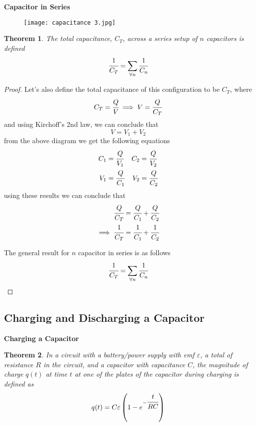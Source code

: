 \documentclass{article}
\newtheorem{theorem}{Theorem}[subsection]
\begin{document}
\textbf{Capacitor in Series}
\begin{figure}[H]
    \centering
    \texttt{[image: capacitance 3.jpg]}
\end{figure}

\begin{theorem}
The total capacitance, $C_T$, across a series setup of $n$ capacitors is defined
$$\cfrac{1}{C_T}=\sum\limits_{\forall n} \cfrac{1}{C_n}$$
\end{theorem}

\begin{proof}
Let's also define the total capacitance of this configuration to be $C_T$, where
$$C_T=\cfrac{Q}{V}\implies V=\cfrac{Q}{C_T}$$
and using Kirchoff's 2nd law, we can conclude that 
$$V=V_1+V_2$$
from the above diagram we get the following equations
\begin{align*}
    C_1&=\cfrac{Q}{V_1} & C_2&=\cfrac{Q}{V_2} \\
    V_1 &=\cfrac{Q}{C_1} & V_2&=\cfrac{Q}{C_2}
\end{align*}
using these results we can conclude that 
\begin{align*} 
    \cfrac{Q}{C_T}&=\cfrac{Q}{C_1}+\cfrac{Q}{C_2}\\
    \implies \cfrac{1}{C_T}&=\cfrac{1}{C_1}+\cfrac{1}{C_2}
\end {align*}

The general result for $n$ capacitor in series is as follows
$$\cfrac{1}{C_T}=\sum\limits_{\forall n}\cfrac{1}{C_n}$$
\end{proof}

 \subsection{Charging and Discharging a Capacitor}

\begin{flushleft}
\textbf{Charging a Capacitor}
\end{flushleft}

\begin{theorem}
In a circuit with a battery/power supply with emf $\varepsilon$, a total of resistance $R$ in the circuit, and a capacitor with capacitance $C$, the magnitude of charge $q(t)$ at time $t$ at one of the plates of the capacitor during charging is defined as
$$q(t)= C\varepsilon\left(1- e^{-\cfrac{t}{RC}}\right)$$
\end{theorem}
\end{document}
